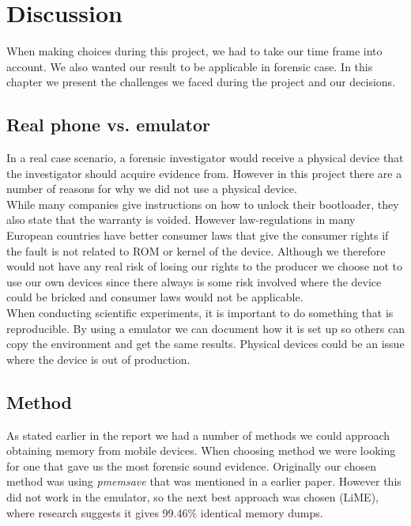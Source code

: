 \section{Discussion}
When making choices during this project, we had to take our time frame into account. 
We also wanted our result to be applicable in forensic case. In this chapter we present the 
challenges we faced during the project and our decisions.

\subsection{Real phone vs. emulator}
In a real case scenario, a forensic investigator would receive a physical device 
that the investigator should acquire evidence from. However in this project there 
are a number of reasons for why we did not use a physical device.\\

While many companies give instructions on how to unlock their bootloader, they also 
state that the warranty is voided. However law-regulations in many European countries 
have better consumer laws that give the consumer rights if the fault %
is not related to ROM or kernel of the device. Although we therefore would not have 
any real risk of losing our rights to the producer we choose not to use our own 
devices since there always is some risk involved where the device could be bricked 
and consumer laws would not be applicable.\\

When conducting scientific experiments, it is important to do something that is 
reproducible. By using a emulator we can document how it is set up so others can 
copy the environment and get the same results. Physical devices could be an issue 
where the device is out of production.

\subsection{Method}
As stated earlier in the report we had a number of methods we could approach 
obtaining memory from mobile devices. When choosing method we were looking for one 
that gave us the most forensic sound evidence. Originally our chosen method was 
using \textit{pmemsave} %
that was mentioned in a earlier paper\cite{acq_vol_android_mem}. However this did 
not work in the emulator, so the next best approach was chosen (LiME), where research suggests 
it gives 99.46\% identical memory dumps\cite{acq_vol_android_mem}.

